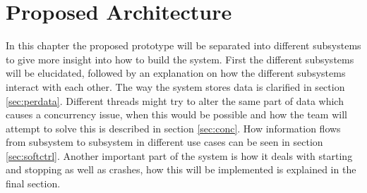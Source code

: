 \chapter{Proposed Architecture}
In this chapter the proposed prototype will be separated into different subsystems to give more insight into how to build the system. First the different subsystems will be elucidated, followed by an explanation on how the different subsystems interact with each other. The way the system stores data is clarified in section \ref{sec:perdata}. Different threads might try to alter the same part of data which causes a concurrency issue, when this would be possible and how the team will attempt to solve this is described in section \ref{sec:conc}. How information flows from subsystem to subsystem in different use cases can be seen in section \ref{sec:softctrl}. Another important part of the system is how it deals with starting and stopping as well as crashes, how this will be implemented is explained in the final section.